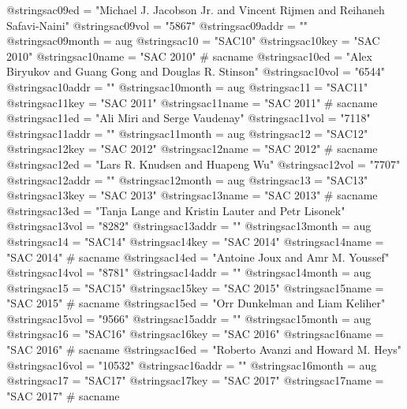 @string{sac09ed =               "Michael J. {Jacobson Jr.} and Vincent Rijmen and Reihaneh Safavi-Naini"}
@string{sac09vol =              "5867"}
@string{sac09addr =             ""}
@string{sac09month =            aug}
@string{sac10 =                 "SAC10"}
@string{sac10key =              "SAC 2010"}
@string{sac10name =             "SAC 2010" # sacname}
@string{sac10ed =               "Alex Biryukov and Guang Gong and Douglas R. Stinson"}
@string{sac10vol =              "6544"}
@string{sac10addr =             ""}
@string{sac10month =            aug}
@string{sac11 =                 "SAC11"}
@string{sac11key =              "SAC 2011"}
@string{sac11name =             "SAC 2011" # sacname}
@string{sac11ed =               "Ali Miri and Serge Vaudenay"}
@string{sac11vol =              "7118"}
@string{sac11addr =             ""}
@string{sac11month =            aug}
@string{sac12 =                 "SAC12"}
@string{sac12key =              "SAC 2012"}
@string{sac12name =             "SAC 2012" # sacname}
@string{sac12ed =               "Lars R. Knudsen and Huapeng Wu"}
@string{sac12vol =              "7707"}
@string{sac12addr =             ""}
@string{sac12month =            aug}
@string{sac13 =                 "SAC13"}
@string{sac13key =              "SAC 2013"}
@string{sac13name =             "SAC 2013" # sacname}
@string{sac13ed =               "Tanja Lange and Kristin Lauter and Petr Lisonek"}
@string{sac13vol =              "8282"}
@string{sac13addr =             ""}
@string{sac13month =            aug}
@string{sac14 =                 "SAC14"}
@string{sac14key =              "SAC 2014"}
@string{sac14name =             "SAC 2014" # sacname}
@string{sac14ed =               "Antoine Joux and Amr M. Youssef"}
@string{sac14vol =              "8781"}
@string{sac14addr =             ""}
@string{sac14month =            aug}
@string{sac15 =                 "SAC15"}
@string{sac15key =              "SAC 2015"}
@string{sac15name =             "SAC 2015" # sacname}
@string{sac15ed =               "Orr Dunkelman and Liam Keliher"}
@string{sac15vol =              "9566"}
@string{sac15addr =             ""}
@string{sac15month =            aug}
@string{sac16 =                 "SAC16"}
@string{sac16key =              "SAC 2016"}
@string{sac16name =             "SAC 2016" # sacname}
@string{sac16ed =               "Roberto Avanzi and Howard M. Heys"}
@string{sac16vol =              "10532"}
@string{sac16addr =             ""}
@string{sac16month =            aug}
@string{sac17 =                 "SAC17"}
@string{sac17key =              "SAC 2017"}
@string{sac17name =             "SAC 2017" # sacname}
